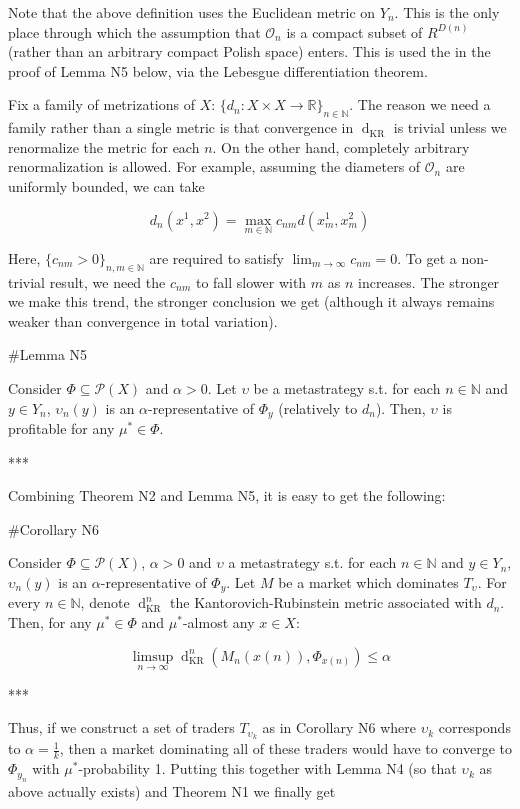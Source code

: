 \documentclass[a4paper]{article}
\newcommand{\Nats}{\mathbb{N}}
\newcommand{\Reals}{\mathbb{R}}
\newcommand{\Prob}{\mathcal{P}}
\newcommand{\Ob}{\mathcal{O}}
\newcommand{\Dkr}{\operatorname{d}_{\text{KR}}}
\begin{document}
Note that the above definition uses the Euclidean metric on ${Y_n}$. This is the only place through which the assumption that ${\Ob_n}$ is a compact subset of ${R^{D(n)}}$ (rather than an arbitrary compact Polish space) enters. This is used the in the proof of Lemma N5 below, via the Lebesgue differentiation theorem.

Fix a family of metrizations of ${X}$: ${\{d_n: X \times X \rightarrow \Reals\}_{n \in \Nats}}$. The reason we need a family rather than a single metric is that convergence in ${\Dkr}$ is trivial unless we renormalize the metric for each ${n}$. On the other hand, completely arbitrary renormalization is allowed. For example, assuming the diameters of $\Ob_n$ are uniformly bounded, we can take 

$$d_n(x^1,x^2)= \max_{m \in \Nats} c_{nm} d(x^1_m,x^2_m)$$

Here, ${\{c_{nm} > 0\}_{n,m \in \Nats}}$ are required to satisfy ${\lim_{m \rightarrow \infty} c_{nm} = 0}$. To get a non-trivial result, we need the ${c_{nm}}$ to fall slower with ${m}$ as ${n}$ increases. The stronger we make this trend, the stronger conclusion we get (although it always remains weaker than convergence in total variation).

\#Lemma N5

Consider ${\Phi \subseteq \Prob(X)}$ and ${\alpha > 0}$. Let ${\upsilon}$ be a metastrategy s.t. for each ${n \in \Nats}$ and ${y \in Y_n}$, ${\upsilon_n(y)}$ is an $\alpha$-representative of ${\Phi_y}$ (relatively to $d_n$). Then, ${\upsilon}$ is profitable for any ${\mu^* \in \Phi}$.

***

Combining Theorem N2 and Lemma N5, it is easy to get the following:

\#Corollary N6

Consider ${\Phi \subseteq \Prob(X)}$, ${\alpha > 0}$ and ${\upsilon}$ a metastrategy s.t. for each ${n \in \Nats}$ and ${y \in Y_n}$, ${\upsilon_n(y)}$ is an $\alpha$-representative of ${\Phi_y}$. Let ${M}$ be a market which dominates ${T_\upsilon}$. For every ${n \in \Nats}$, denote ${\Dkr^n}$ the Kantorovich-Rubinstein metric associated with ${d_n}$. Then, for any ${\mu^* \in \Phi}$ and ${\mu^*}$-almost any ${x \in X}$:

$$\limsup_{n \rightarrow \infty} \Dkr^n(M_n(x(n)),\Phi_{x(n)}) \leq \alpha$$

***

Thus, if we construct a set of traders ${T_{\upsilon_k}}$ as in Corollary N6 where ${\upsilon_k}$ corresponds to ${\alpha=\frac{1}{k}}$, then a market dominating all of these traders would have to converge to ${\Phi_{y_n}}$ with ${\mu^*}$-probability 1. Putting this together with Lemma N4 (so that ${\upsilon_k}$ as above actually exists) and Theorem N1 we finally get
\end{document}
